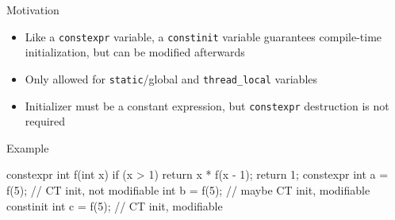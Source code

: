 \begin{frame}[fragile]
  \begin{block}{Motivation}
    \begin{itemize}
    \item Like a \texttt{constexpr} variable, a \texttt{constinit} variable guarantees compile-time initialization, but can be modified afterwards
    \item Only allowed for \texttt{static}/global and \texttt{thread_local} variables
    \item Initializer must be a constant expression, but \texttt{constexpr} destruction is not required
    \end{itemize}
  \end{block}
  \begin{exampleblock}{Example}
    \begin{cppcode}
      constexpr int f(int x) {
        if (x > 1) return x * f(x - 1);
        return 1;
      }
      constexpr int a = f(5); // CT init, not modifiable
      int b           = f(5); // maybe CT init, modifiable
      constinit int c = f(5); // CT init, modifiable
    \end{cppcode}
  \end{exampleblock}
\end{frame}
